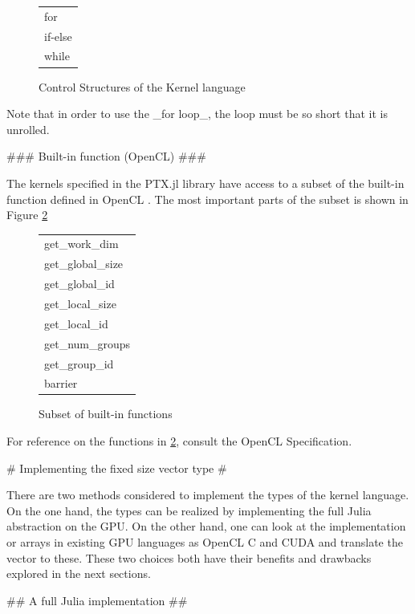 \begin{markdown}
\begin{figure}[H]
  \centering
  \begin{tabular}{|l|}
  \hline
  for\\
  if-else\\
  while\\
  \hline
  \end{tabular}
  \caption{Control Structures of the Kernel language}
  \label{tab:control}
\end{figure}

Note that in order to use the _for loop_, the loop must be so short
that it is unrolled.

### Built-in function (OpenCL) ###
\label{sec:meth:built-ins}

The kernels specified in the PTX.jl library have access to a subset of
the built-in function defined in OpenCL \cite{opencl}. The most
important parts of the subset is shown in Figure \ref{fig:meth:built-ins}

\begin{figure}[H]
  \centering
  \begin{tabular}{|l|}
    \hline
    get\_work\_dim\\
    get\_global\_size\\
    get\_global\_id\\
    get\_local\_size\\
    get\_local\_id\\
    get\_num\_groups\\
    get\_group\_id\\
    barrier\\
    \hline
  \end{tabular}
  \caption{Subset of built-in functions}
  \label{fig:meth:built-ins}
\end{figure}

For reference on the functions in \ref{fig:meth:built-ins}, consult the OpenCL Specification.

# Implementing the fixed size vector type #

There are two methods considered to implement the types of the kernel
language. On the one hand, the types can be realized by implementing
the full Julia abstraction on the GPU. On the other hand, one can look
at the implementation or arrays in existing GPU languages as OpenCL C
and CUDA and translate the vector to these. These two choices both
have their benefits and drawbacks explored in the next sections.

## A full Julia implementation ##


\end{markdown}
